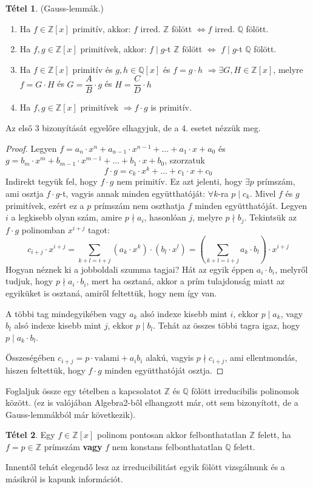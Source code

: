 \documentclass[12pt]{book}
\theoremstyle{plain} %
\theoremstyle{definition} %
\newtheorem{theo/}{Tétel}[section]
\newenvironment{theo}
  {\renewcommand{\qedsymbol}{$\clubsuit$}%
   \pushQED{\qed}\begin{theo/}}
  {\popQED\end{theo/}}
\theoremstyle{remark}
\renewcommand\qedsymbol{$\blacksquare$}
\numberwithin{equation}{section}  %
\begin{document}
	\begin{theo}\label{gl}
		(Gauss-lemmák.)
		\begin{enumerate}
			\item Ha $f\in \mathbb{Z}[x]$ primitív, akkor: $f$ irred. $\mathbb{Z}$ fölött $\Leftrightarrow f$ irred. $\mathbb{Q}$ fölött.
			\item Ha $f,g\in \mathbb{Z}[x]$ primitívek, akkor: $f\mid g$-t $\mathbb{Z}$ fölött $\Leftrightarrow$ $f\mid g$-t $\mathbb{Q}$ fölött.
			\item Ha $f\in \mathbb{Z}[x]$ primitív és $g,h\in \mathbb{Q}[x]$ és $f=g\cdot h$ $\Rightarrow \exists G,H\in \mathbb{Z}[x]$, melyre $f=G\cdot H$ és $G=\dfrac{A}{B}\cdot g$ és $H=\dfrac{C}{D}\cdot h$
			\item Ha $f,g \in \mathbb{Z}[x]$ primitívek $\Rightarrow f\cdot g$ is primitív.
		\end{enumerate}
	\end{theo}
	Az első 3 bizonyítását egyelőre elhagyjuk, de a 4. esetet nézzük meg.
	\begin{proof}
		Legyen $f=a_n\cdot x^n + a_{n-1}\cdot x^{n-1} + \ldots + a_1\cdot x + a_0$ és $g=b_m\cdot x^m + b_{m-1}\cdot x^{m-1} + \ldots + b_1\cdot x + b_0$, szorzatuk
		\[ f\cdot g = c_k\cdot x^k + \ldots + c_1 \cdot x + c_0  \]
		Indirekt tegyük fel, hogy $f\cdot g$ nem primitív. Ez azt jelenti, hogy $\exists p$ prímszám, ami osztja $f\cdot g$-t, vagyis annak minden együtthatóját: $\forall k$-ra $p \mid c_k$. Mivel $f$ és $g$ primitívek, ezért ez a $p$ prímszám nem oszthatja $f$ minden együtthatóját. Legyen $i$ a legkisebb olyan szám, amire $p \nmid a_i$, hasonlóan $j$, melyre $p \nmid b_j$.
		Tekintsük az $f\cdot g$ polinomban $x^{i+j}$ tagot:
		\[ c_{i+j} \cdot x^{i+j}= \displaystyle\sum_{k+l=i+j} {(a_k\cdot x^k)\cdot (b_l\cdot x^l)} = \left( \displaystyle\sum_{k+l=i+j} a_k \cdot b_l \right) \cdot x^{i+j} \]
		Hogyan néznek ki a jobboldali szumma tagjai? Hát az egyik éppen $a_i\cdot b_i$, melyről tudjuk, hogy $p \nmid a_i\cdot b_i$, mert ha osztaná, akkor a prím tulajdonság miatt az egyiküket is osztaná, amiről feltettük, hogy nem így van.
		
		A többi tag mindegyikében vagy $a_k$ alsó indexe kisebb mint $i$, ekkor $p\mid a_k$, vagy $b_l$ alsó indexe kisebb mint $j$, ekkor $p\mid b_l$. Tehát az összes többi tagra igaz, hogy $p\mid a_k\cdot b_l$.
		
		Összeségében $c_{i+j} = p\cdot \text{valami} + a_i b_i$ alakú, vagyis $p \nmid c_{i+j}$, ami ellentmondás, hiszen feltettük, hogy $f\cdot g$ minden együtthatóját osztja.
	\end{proof}
	Foglaljuk össze egy tételben a kapcsolatot $\mathbb{Z}$ és $\mathbb{Q}$ fölött irreducibilis polinomok között. (ez is valójában Algebra2-ből elhangzott már, ott sem bizonyított, de a Gauss-lemmákból már következik).
	\begin{theo}
		Egy $f\in \mathbb{Z}[x]$ polinom pontosan akkor felbonthatatlan $\mathbb{Z}$ felett, ha $f=p\in \mathbb{Z}$ prímszám \textbf{vagy} $f$ nem konstans felbonthatatlan $\mathbb{Q}$ felett.
	\end{theo}
	Innentől tehát elegendő lesz az irreducibilitást egyik fölött vizsgálnunk és a másikról is kapunk információt.
	
\end{document}

